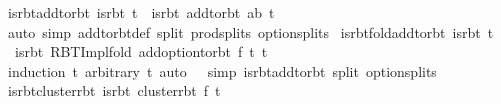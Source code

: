 \begin{isabellebody}
\isanewline
\isanewline
{}\isamarkupfalse%
\ is{\isacharunderscore}{\kern0pt}rbt{\isacharunderscore}{\kern0pt}add{\isacharunderscore}{\kern0pt}to{\isacharunderscore}{\kern0pt}rbt{\isacharcolon}{\kern0pt}\ {\isachardoublequoteopen}is{\isacharunderscore}{\kern0pt}rbt\ t\ {\isasymLongrightarrow}\ is{\isacharunderscore}{\kern0pt}rbt\ {\isacharparenleft}{\kern0pt}add{\isacharunderscore}{\kern0pt}to{\isacharunderscore}{\kern0pt}rbt\ ab\ t{\isacharparenright}{\kern0pt}{\isachardoublequoteclose}\isanewline
%
\isadelimproof
\ \ %
\endisadelimproof
%
\isatagproof
{}\isamarkupfalse%
\ {\isacharparenleft}{\kern0pt}auto\ simp{\isacharcolon}{\kern0pt}\ add{\isacharunderscore}{\kern0pt}to{\isacharunderscore}{\kern0pt}rbt{\isacharunderscore}{\kern0pt}def\ split{\isacharcolon}{\kern0pt}\ prod{\isachardot}{\kern0pt}splits\ option{\isachardot}{\kern0pt}splits{\isacharparenright}{\kern0pt}%
\endisatagproof
{\isafoldproof}%
%
\isadelimproof
\isanewline
%
\endisadelimproof
\isanewline
{}\isamarkupfalse%
\ is{\isacharunderscore}{\kern0pt}rbt{\isacharunderscore}{\kern0pt}fold{\isacharunderscore}{\kern0pt}add{\isacharunderscore}{\kern0pt}to{\isacharunderscore}{\kern0pt}rbt{\isacharcolon}{\kern0pt}\ {\isachardoublequoteopen}is{\isacharunderscore}{\kern0pt}rbt\ t{\isacharprime}{\kern0pt}\ {\isasymLongrightarrow}\isanewline
\ \ is{\isacharunderscore}{\kern0pt}rbt\ {\isacharparenleft}{\kern0pt}RBT{\isacharunderscore}{\kern0pt}Impl{\isachardot}{\kern0pt}fold\ {\isacharparenleft}{\kern0pt}add{\isacharunderscore}{\kern0pt}option{\isacharunderscore}{\kern0pt}to{\isacharunderscore}{\kern0pt}rbt\ f{\isacharparenright}{\kern0pt}\ t\ t{\isacharprime}{\kern0pt}{\isacharparenright}{\kern0pt}{\isachardoublequoteclose}\isanewline
%
\isadelimproof
\ \ %
\endisadelimproof
%
\isatagproof
{}\isamarkupfalse%
\ {\isacharparenleft}{\kern0pt}induction\ t\ arbitrary{\isacharcolon}{\kern0pt}\ t{\isacharprime}{\kern0pt}{\isacharparenright}{\kern0pt}\ {\isacharparenleft}{\kern0pt}auto\ {}\ {}\ simp{\isacharcolon}{\kern0pt}\ is{\isacharunderscore}{\kern0pt}rbt{\isacharunderscore}{\kern0pt}add{\isacharunderscore}{\kern0pt}to{\isacharunderscore}{\kern0pt}rbt\ split{\isacharcolon}{\kern0pt}\ option{\isachardot}{\kern0pt}splits{\isacharparenright}{\kern0pt}%
\endisatagproof
{\isafoldproof}%
%
\isadelimproof
\isanewline
%
\endisadelimproof
\isanewline
{}\isamarkupfalse%
\ is{\isacharunderscore}{\kern0pt}rbt{\isacharunderscore}{\kern0pt}cluster{\isacharunderscore}{\kern0pt}rbt{\isacharcolon}{\kern0pt}\ {\isachardoublequoteopen}is{\isacharunderscore}{\kern0pt}rbt\ {\isacharparenleft}{\kern0pt}cluster{\isacharunderscore}{\kern0pt}rbt\ f\ t{\isacharparenright}{\kern0pt}{\isachardoublequoteclose}\isanewline

\end{isabellebody}

